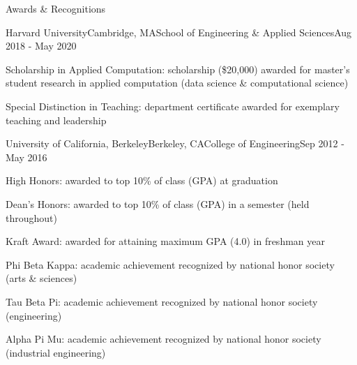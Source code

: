 \documentclass{resume} %
\begin{document}

\begin{rSection}{Awards \& Recognitions}

\begin{rSubsection}{Harvard University}{Cambridge, MA}{School of Engineering \& Applied Sciences}{Aug 2018 - May 2020}
	\item Scholarship in Applied Computation: scholarship (\$20,000) awarded for master's student research in applied computation (data science \& computational science)
       	\item Special Distinction in Teaching: department certificate awarded for exemplary teaching and leadership
\end{rSubsection}

\begin{rSubsection}{University of California, Berkeley}{Berkeley, CA}{College of Engineering}{Sep 2012 - May 2016}
	\item High Honors: awarded to top 10\% of class (GPA) at graduation
        \item Dean's Honors: awarded to top 10\% of class (GPA) in a semester (held throughout)
        \item Kraft Award: awarded for attaining maximum GPA (4.0) in freshman year
        \item Phi Beta Kappa: academic achievement recognized by national honor society (arts \& sciences) 
	\item Tau Beta Pi: academic achievement recognized by national honor society (engineering) 
        \item Alpha Pi Mu: academic achievement recognized by national honor society (industrial engineering) 
\end{rSubsection}




\end{rSection}
\end{document}
